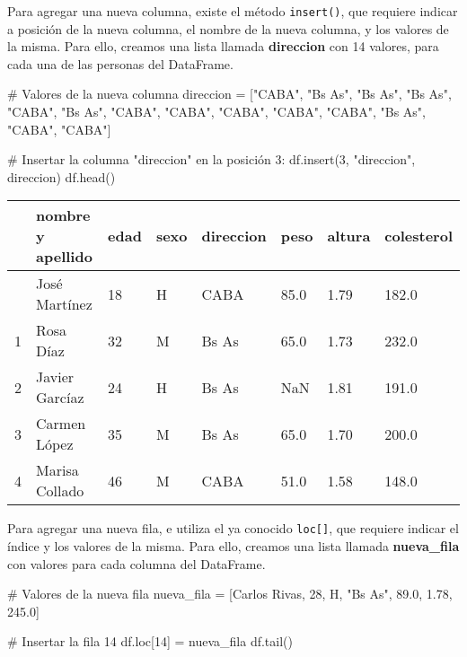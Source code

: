 \documentclass[
  letterpaper,
  DIV=11,
  numbers=noendperiod]{scrreprt}
\newenvironment{Shaded}{\begin{snugshade}}{\end{snugshade}}
\newcommand{\CommentTok}[1]{\textcolor[rgb]{0.37,0.37,0.37}{#1}}
\newcommand{\DecValTok}[1]{\textcolor[rgb]{0.68,0.00,0.00}{#1}}
\newcommand{\FloatTok}[1]{\textcolor[rgb]{0.68,0.00,0.00}{#1}}
\newcommand{\NormalTok}[1]{\textcolor[rgb]{0.00,0.23,0.31}{#1}}
\newcommand{\OperatorTok}[1]{\textcolor[rgb]{0.37,0.37,0.37}{#1}}
\newcommand{\StringTok}[1]{\textcolor[rgb]{0.13,0.47,0.30}{#1}}
\begin{document}
Para agregar una nueva columna, existe el método \texttt{insert()}, que
requiere indicar a posición de la nueva columna, el nombre de la nueva
columna, y los valores de la misma. Para ello, creamos una lista llamada
\textbf{direccion} con 14 valores, para cada una de las personas del
DataFrame.

\begin{Shaded}
\begin{Highlighting}[]
\CommentTok{\# Valores de la nueva columna}
\NormalTok{direccion }\OperatorTok{=}\NormalTok{ [}\StringTok{"CABA"}\NormalTok{, }\StringTok{"Bs As"}\NormalTok{, }\StringTok{"Bs As"}\NormalTok{, }\StringTok{"Bs As"}\NormalTok{, }\StringTok{"CABA"}\NormalTok{, }\StringTok{"Bs As"}\NormalTok{, }\StringTok{"CABA"}\NormalTok{, }\StringTok{"CABA"}\NormalTok{, }\StringTok{"CABA"}\NormalTok{, }\StringTok{"CABA"}\NormalTok{, }\StringTok{"CABA"}\NormalTok{, }\StringTok{"Bs As"}\NormalTok{, }\StringTok{"CABA"}\NormalTok{, }\StringTok{"CABA"}\NormalTok{]}

\CommentTok{\# Insertar la columna "direccion" en la posición 3:}
\NormalTok{df.insert(}\DecValTok{3}\NormalTok{, }\StringTok{"direccion"}\NormalTok{, direccion)}
\NormalTok{df.head()}
\end{Highlighting}
\end{Shaded}

\begin{longtable}[]{@{}llllllll@{}}
\toprule\noalign{}
& nombre y apellido & edad & sexo & direccion & peso & altura &
colesterol \\
\midrule\noalign{}
\endhead
\bottomrule\noalign{}
\endlastfoot
0 & José Martínez & 18 & H & CABA & 85.0 & 1.79 & 182.0 \\
1 & Rosa Díaz & 32 & M & Bs As & 65.0 & 1.73 & 232.0 \\
2 & Javier Garcíaz & 24 & H & Bs As & NaN & 1.81 & 191.0 \\
3 & Carmen López & 35 & M & Bs As & 65.0 & 1.70 & 200.0 \\
4 & Marisa Collado & 46 & M & CABA & 51.0 & 1.58 & 148.0 \\
\end{longtable}

Para agregar una nueva fila, e utiliza el ya conocido
\texttt{loc{[}{]}}, que requiere indicar el índice y los valores de la
misma. Para ello, creamos una lista llamada \textbf{nueva\_fila} con
valores para cada columna del DataFrame.

\begin{Shaded}
\begin{Highlighting}[]
\CommentTok{\# Valores de la nueva fila}
\NormalTok{nueva\_fila }\OperatorTok{=}\NormalTok{ [}\StringTok{\textquotesingle{}Carlos Rivas\textquotesingle{}}\NormalTok{, }\DecValTok{28}\NormalTok{, }\StringTok{\textquotesingle{}H\textquotesingle{}}\NormalTok{, }\StringTok{"Bs As"}\NormalTok{, }\FloatTok{89.0}\NormalTok{, }\FloatTok{1.78}\NormalTok{, }\FloatTok{245.0}\NormalTok{]}

\CommentTok{\# Insertar la fila 14}
\NormalTok{df.loc[}\DecValTok{14}\NormalTok{] }\OperatorTok{=}\NormalTok{ nueva\_fila}
\NormalTok{df.tail()}
\end{Highlighting}
\end{Shaded}
\end{document}

